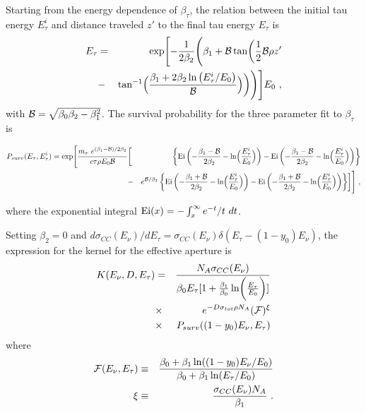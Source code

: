 \documentclass[aps,10pt,twocolumn,tightenlines]{revtex4-1}
\begin{document}
\begin{appendix}
Starting from the energy dependence of $\beta_\tau$, the relation between the
initial tau energy $E_\tau^i$ and distance traveled $z'$ to the final tau energy $E_\tau$ is
\begin{eqnarray}
\label{eq:etau-3par}
E_\tau &=& \exp \Biggl[ -\frac{1}{2 \beta_2}  \Biggl( \beta_1 
+ {\cal B} 
\tan \biggl( \frac{1}{2}  {\cal B} \rho z' \\
\nonumber  
&-&  \tan^{-1} \Bigl( \frac{\beta_1 + 2\beta_2 \ln \left(E_\tau^i /E_0\right)}{{\cal B}} 
\Bigr)
 \biggr)
\Biggr) \Biggr] E_0  \ ,
\end{eqnarray}
with ${\cal B} = \sqrt{\beta_0 \beta_2 - \beta_1^2}$. 
The survival probability for the three parameter fit to $\beta_\tau$ is
\begin{widetext}
\begin{eqnarray}
\label{eq:psurv-3par}
P_{surv}(E_\tau, E_\tau^i)= \exp \Biggl[ \frac{m_\tau \ e^{(\beta _1-{\cal B})/2 \beta _2 } }{c \tau \rho E_0 {\cal B}} 
&\biggl[& 
\left\{ {\rm Ei} \left(-\frac{\beta _1-{\cal B}}{2 \beta _2}-\ln \Bigl(\frac{E_\tau^i}{E_0} \Bigr) \right)
-{\rm Ei} \left(-\frac{\beta _1-{\cal B}}{2 \beta _2}-\ln \Bigl(\frac{E_\tau^i}{E_0} \Bigr) \right) \right\} \\
\nonumber
&-& e^{{\cal B}/\beta_2}
\left\{ {\rm Ei} \left(-\frac{\beta _1+{\cal B}}{2 \beta _2}-\ln \Bigl(\frac{E_\tau^i}{E_0} \Bigr) \right)
-{\rm Ei} \left(-\frac{\beta _1+{\cal B}}{2 \beta _2}-\ln \Bigl(\frac{E_\tau^i}{E_0} \Bigr) \right) \right\}
\biggr] 
\Biggr] \ ,
\end{eqnarray}
\end{widetext}
where the exponential integral $ {\rm Ei} (x)  =  -\int^\infty_x e^{-t}/t \ dt$. 


Setting $\beta_2=0$ and $d\sigma_{CC}(E_\nu)/dE_\tau=\sigma_{CC}(E_\nu)\delta(E_\tau-(1-y_0)E_\nu)$, the expression for the kernel for the effective aperture is 
\begin{eqnarray}
K(E_\nu,D,E_\tau) &=& \frac{N_A\sigma_{CC}(E_\nu)}{\beta_0 E_\tau[1+\frac{\beta_1}{\beta_0}\ln\biggl(\frac{E_\tau}{E_0}\biggr)]}\\
\nonumber 
&\times & e^{-D\sigma_{tot}\rho N_A}({\cal F})^\xi \\
\nonumber &\times &
P_{surv}((1-y_0)E_\nu, E_\tau)
\end{eqnarray}
where 
\begin{eqnarray}
{\cal F}(E_\nu,E_\tau)&\equiv& \frac{\beta_0+\beta_1\ln((1-y_0)E_\nu/E_0)}{\beta_0+\beta_1\ln(E_\tau/E_0)}\\
\xi &\equiv& \frac{\sigma_{CC}(E_\nu) N_A}{\beta_1}\ .
\end{eqnarray}



\end{appendix}
\end{document}
